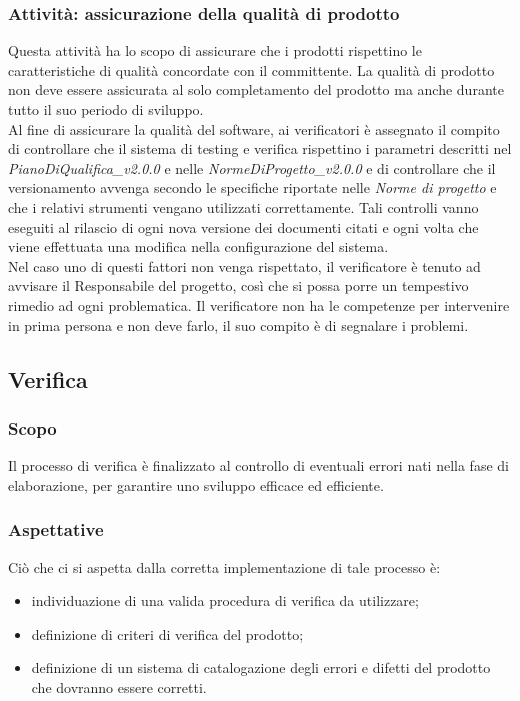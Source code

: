 \documentclass[11pt,a4paper]{article}
\begin{document}
{	\subsubsection{Attività: assicurazione della qualità di prodotto}
	Questa attività ha lo scopo di assicurare che i prodotti rispettino le caratteristiche di qualità concordate con il committente. La qualità di prodotto non deve essere assicurata al solo completamento del prodotto ma anche durante tutto il suo periodo di sviluppo. \\
	Al fine di assicurare la qualità del software, ai verificatori è assegnato il compito di controllare che il sistema di testing e verifica rispettino i parametri descritti nel \textit{PianoDiQualifica\_v2.0.0} e nelle \textit{NormeDiProgetto\_v2.0.0} e di controllare che il versionamento avvenga secondo le specifiche riportate nelle \textit{Norme di progetto} e che i relativi strumenti vengano utilizzati correttamente. Tali controlli vanno eseguiti al rilascio di ogni nova versione dei documenti citati e ogni volta che viene effettuata una modifica nella configurazione del sistema.\\
	Nel caso uno di questi fattori non venga rispettato, il verificatore è tenuto ad avvisare il Responsabile del progetto, così che si possa porre un tempestivo rimedio ad ogni problematica. Il verificatore non ha le competenze per intervenire in prima persona e non deve farlo, il suo compito è di segnalare i problemi.
	
	\subsection{Verifica}
	
	\subsubsection{Scopo}
	Il processo di verifica è finalizzato al controllo di eventuali errori nati nella fase di elaborazione, per garantire uno sviluppo efficace ed efficiente.
	
	\subsubsection{Aspettative}
	Ciò che ci si aspetta dalla corretta implementazione di tale processo è:
	\begin{itemize}
		\item individuazione di una valida procedura di verifica da utilizzare;
		\item definizione di criteri di verifica del prodotto;
		\item definizione di un sistema di catalogazione degli errori e difetti del prodotto che dovranno essere corretti.
	\end{itemize}	
	
}
\end{document}
